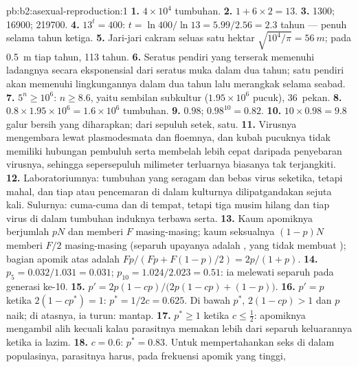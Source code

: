 \begin{solution}{pb:b2:asexual-reproduction:1}
\textbf{1.} $4\times 10^{4}$ tumbuhan.
\textbf{2.} $1 + 6\times 2 = 13$.
\textbf{3.} \num{1300}; \num{16900}; \num{219700}.
\textbf{4.} $13^{t} = 400$: $t = \ln 400/\ln 13 = 5.99/2.56 = 2.3$
tahun --- penuh selama tahun ketiga.
\textbf{5.} Jari-jari cakram seluas satu hektar
$\sqrt{10^{4}/\pi} = \qty{56}{m}$; pada \qty{0.5}{m} tiap tahun,
\num{113} tahun.
\textbf{6.} Seratus pendiri yang terserak memenuhi ladangnya secara
eksponensial dari seratus muka dalam dua tahun; satu pendiri akan
memenuhi lingkungannya dalam dua tahun lalu merangkak selama seabad.
\textbf{7.} $5^{n} \ge 10^{6}$: $n \ge 8.6$, yaitu sembilan subkultur
($1.95\times 10^{6}$ pucuk), 36~pekan.
\textbf{8.} $0.8\times 1.95\times 10^{6} = 1.6\times 10^{6}$ tumbuhan.
\textbf{9.} $0.98$; $0.98^{10} = 0.82$.
\textbf{10.} $10\times 0.98 = 9.8$ galur bersih yang diharapkan; dari
sepuluh setek, satu.
\textbf{11.} Virusnya mengembara lewat plasmodesmata dan floemnya, dan
kubah pucuknya tidak memiliki hubungan pembuluh serta membelah lebih
cepat daripada penyebaran virusnya, sehingga sepersepuluh milimeter
terluarnya biasanya tak terjangkiti.
\textbf{12.} Laboratoriumnya: tumbuhan yang seragam dan bebas virus
seketika, tetapi mahal, dan tiap  atau pencemaran di dalam
kulturnya dilipatgandakan sejuta kali. Sulurnya: cuma-cuma dan di
tempat, tetapi tiga musim hilang dan tiap virus di dalam tumbuhan
induknya terbawa serta.
\textbf{13.} Kaum apomiknya berjumlah $pN$ dan memberi $F$ 
masing-masing; kaum seksualnya $(1 - p)N$ memberi $F/2$ 
masing-masing (separuh upayanya adalah , yang tidak membuat
); bagian apomik atas  adalah $Fp/(Fp + F(1 - p)/2)
= 2p/(1 + p)$.
\textbf{14.} $p_5 = 0.032/1.031 = 0.031$; $p_{10} = 1.024/2.023 =
0.51$: ia melewati separuh pada generasi ke-10.
\textbf{15.} $p' = 2p(1 - cp)/\bigl(2p(1 - cp) + (1 - p)\bigr)$.
\textbf{16.} $p' = p$ ketika $2(1 - cp^*) = 1$: $p^* = 1/2c = 0.625$.
Di bawah $p^*$, $2(1 - cp) > 1$ dan $p$ naik; di atasnya, ia turun:
mantap.
\textbf{17.} $p^* \ge 1$ ketika $c \le \tfrac12$: apomiknya mengambil
alih kecuali kalau parasitnya memakan lebih dari separuh keluarannya
ketika ia lazim.
\textbf{18.} $c = 0.6$: $p^* = 0.83$. Untuk mempertahankan seks di
dalam populasinya, parasitnya harus, pada frekuensi apomik yang tinggi,

\end{solution}

